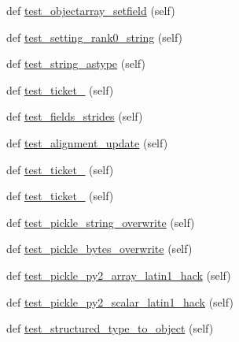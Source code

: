 \begin{DoxyCompactItemize}
\item 
def \hyperlink{classnumpy_1_1core_1_1tests_1_1test__regression_1_1TestRegression_ab604bc4807e3231b412b362f600821cf}{test\+\_\+objectarray\+\_\+setfield} (self)
\item 
def \hyperlink{classnumpy_1_1core_1_1tests_1_1test__regression_1_1TestRegression_aa971b1fd032c0e06b2c018b0333f7d88}{test\+\_\+setting\+\_\+rank0\+\_\+string} (self)
\item 
def \hyperlink{classnumpy_1_1core_1_1tests_1_1test__regression_1_1TestRegression_a526039d64a3f2722998f64af78ac30c4}{test\+\_\+string\+\_\+astype} (self)
\item 
def \hyperlink{classnumpy_1_1core_1_1tests_1_1test__regression_1_1TestRegression_ae115cdc6a448e20ed23b1b704b6205be}{test\+\_\+ticket\+\_} (self)
\item 
def \hyperlink{classnumpy_1_1core_1_1tests_1_1test__regression_1_1TestRegression_a617f56b0102fe0068477474f3b0dcc21}{test\+\_\+fields\+\_\+strides} (self)
\item 
def \hyperlink{classnumpy_1_1core_1_1tests_1_1test__regression_1_1TestRegression_a6eeec7ae29bfda23c5a3f70e5503a9c5}{test\+\_\+alignment\+\_\+update} (self)
\item 
def \hyperlink{classnumpy_1_1core_1_1tests_1_1test__regression_1_1TestRegression_a575ba93bfe34294d343751eecdb21757}{test\+\_\+ticket\+\_} (self)
\item 
def \hyperlink{classnumpy_1_1core_1_1tests_1_1test__regression_1_1TestRegression_ab743b5254c9bb845b7da6e823e39099d}{test\+\_\+ticket\+\_} (self)
\item 
def \hyperlink{classnumpy_1_1core_1_1tests_1_1test__regression_1_1TestRegression_aaa0dec6e0207db6c89a9cec684a50905}{test\+\_\+pickle\+\_\+string\+\_\+overwrite} (self)
\item 
def \hyperlink{classnumpy_1_1core_1_1tests_1_1test__regression_1_1TestRegression_a808252b3c0ca43707844f805d8e7c05b}{test\+\_\+pickle\+\_\+bytes\+\_\+overwrite} (self)
\item 
def \hyperlink{classnumpy_1_1core_1_1tests_1_1test__regression_1_1TestRegression_a3185ff8c49fccc69970f4779f976870f}{test\+\_\+pickle\+\_\+py2\+\_\+array\+\_\+latin1\+\_\+hack} (self)
\item 
def \hyperlink{classnumpy_1_1core_1_1tests_1_1test__regression_1_1TestRegression_aabb5c3d5ef229e47613a03cd97dbb252}{test\+\_\+pickle\+\_\+py2\+\_\+scalar\+\_\+latin1\+\_\+hack} (self)
\item 
def \hyperlink{classnumpy_1_1core_1_1tests_1_1test__regression_1_1TestRegression_a295a1295ed515de4d6efe9a906832f92}{test\+\_\+structured\+\_\+type\+\_\+to\+\_\+object} (self)

\end{DoxyCompactItemize}
